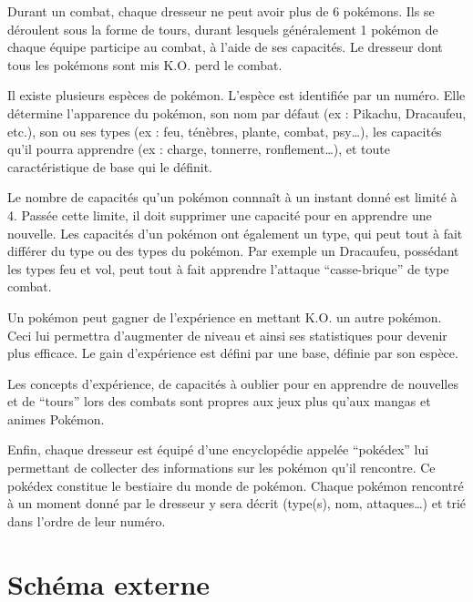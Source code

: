 Durant un combat, chaque dresseur ne peut avoir plus de 6 pokémons. Ils se déroulent sous la forme de tours, durant lesquels généralement 1 pokémon de chaque équipe participe au combat, à l’aide de ses capacités. Le dresseur dont tous les pokémons sont mis K.O. perd le combat.

Il existe plusieurs espèces de pokémon. L’espèce est identifiée par un numéro. Elle détermine l’apparence du pokémon, son nom par défaut (ex : Pikachu, Dracaufeu, etc.), son ou ses types (ex : feu, ténèbres, plante, combat, psy…), les capacités qu’il pourra apprendre (ex : charge, tonnerre, ronflement…), et toute caractéristique de base qui le définit.

Le nombre de capacités qu’un pokémon connnaît à un instant donné est limité à 4. Passée cette limite, il doit supprimer une capacité pour en apprendre une nouvelle. Les capacités d’un pokémon ont également un type, qui peut tout à fait différer du type ou des types du pokémon. Par exemple un Dracaufeu, possédant les types feu et vol, peut tout à fait apprendre l’attaque “casse-brique” de type combat.

Un pokémon peut gagner de l’expérience en mettant K.O. un autre pokémon. Ceci lui permettra d’augmenter de niveau et ainsi ses statistiques pour devenir plus efficace. Le gain d’expérience est défini par une base, définie par son espèce.

Les concepts d’expérience, de capacités à oublier pour en apprendre de nouvelles et de “tours” lors des combats sont propres aux jeux plus qu’aux mangas et animes Pokémon.

Enfin, chaque dresseur est équipé d’une encyclopédie appelée “pokédex” lui permettant de collecter des informations sur les pokémon qu’il rencontre. Ce pokédex constitue le bestiaire du monde de pokémon. Chaque pokémon rencontré à un moment donné par le dresseur y sera décrit (type(s), nom, attaques…) et trié dans l’ordre de leur numéro.

\chapter{Schéma externe}
\label{chap:annexeC}
\hspace{0pt}

